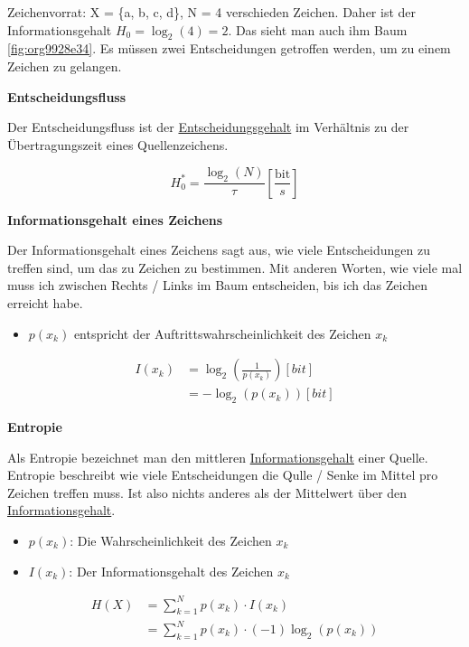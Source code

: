 \documentclass[11pt,twoside,twocolumn,landscape]{article}
\begin{document}
Zeichenvorrat: X = \{a, b, c, d\}, N = 4 verschieden Zeichen.
Daher ist der Informationsgehalt \(H_0 = \log_2(4) = 2\).
Das sieht man auch ihm Baum \ref{fig:org9928e34}.
Es müssen zwei Entscheidungen getroffen werden, um zu einem Zeichen zu gelangen.

\textbf{Entscheidungsfluss}

Der Entscheidungsfluss ist der \href{../../../roam/20211001174136-was_ist_der_entscheidungsgehalt.org}{Entscheidungsgehalt} im Verhältnis zu der Übertragungszeit eines Quellenzeichens.

\begin{equation}
H_0^* = \frac{\log_2(N)}{\tau}[\frac{\text{bit}}{s}]
\end{equation}

\textbf{Informationsgehalt eines Zeichens}

Der Informationsgehalt eines Zeichens sagt aus, wie viele Entscheidungen zu treffen sind, um das zu Zeichen zu bestimmen.
Mit anderen Worten, wie viele mal muss ich zwischen Rechts / Links im Baum entscheiden, bis ich das Zeichen erreicht habe.

\begin{itemize}
\item \(p(x_k)\) entspricht der Auftrittswahrscheinlichkeit des Zeichen \(x_k\)
\end{itemize}

\begin{align}
I(x_k) &= \log_2(\frac{1}{p(x_k)}) [bit] \\
&= -\log_2(p(x_k)) [bit]
\end{align}

\textbf{Entropie}

Als Entropie bezeichnet man den mittleren \href{../../../roam/20211001175826-was_ist_der_informationsgehalt_eines_zeichen.org}{Informationsgehalt} einer Quelle.
Entropie beschreibt wie viele Entscheidungen die Qulle / Senke im Mittel pro Zeichen treffen muss.
Ist also nichts anderes als der Mittelwert über den \href{../../../roam/20211001175826-was_ist_der_informationsgehalt_eines_zeichen.org}{Informationsgehalt}.

\begin{itemize}
\item \(p(x_k)\): Die Wahrscheinlichkeit des Zeichen \(x_k\)
\item \(I(x_k)\): Der Informationsgehalt des Zeichen \(x_k\)
\end{itemize}

\begin{align}
H(X) &= \sum_{k=1}^N p(x_k) \cdot I(x_k) \\
&= \sum_{k=1}^N p(x_k) \cdot (-1)\log_2(p(x_k))
\end{align}
\end{document}
